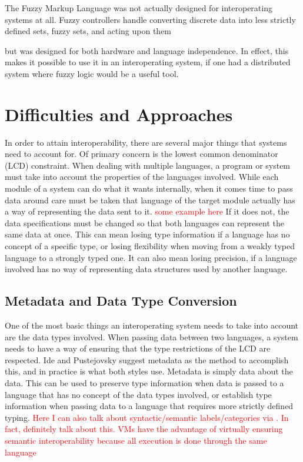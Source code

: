 \documentclass{sig-alternate}
\newcommand{\mycomment}[1]{\textcolor{red}{#1}}
\begin{document}
The Fuzzy Markup Language\cite{Acampora:2013} was not actually designed for interoperating systems at all. Fuzzy controllers handle converting discrete data into less strictly defined sets, fuzzy sets, and acting upon them 

 but was designed for both hardware and language independence. In effect, this makes it possible to use it in an interoperating system, if one had a distributed system where fuzzy logic would be a useful tool.

\section{Difficulties and Approaches}\label{approaches}
In order to attain interoperability, there are several major things that systems need to account for. Of primary concern is the lowest common denominator (LCD) constraint.
When dealing with multiple languages, a program or system must take into account the properties of the languages involved. While each module of a system can do what it wants internally, when it comes time to pass data around care must be taken that language of the target module actually has a way of representing the data sent to it. \mycomment{some example here}
If it does not, the data specifications must be changed so that both languages can represent the same data at once. This can mean losing type information if a language has no concept of a specific type, or losing flexibility when moving from a weakly typed language to a strongly typed one. It can also mean losing precision, if a language involved has no way of representing data structures used by another language.

\subsection{Metadata and Data Type Conversion}\label{metadata} \mycomment{\cite{Ide:2010, Bromberg:2011, Hamilton:2003}}
One of the most basic things an interoperating system needs to take into account are the data types involved. 
When passing data between two languages, a system needs to have a way of ensuring that the type restrictions of the LCD are respected. Ide and Pustejovsky \cite{Ide:2010} suggest metadata as the method to accomplish this, and in practice is what both styles use. Metadata is simply data about the data. This can be used to preserve type information when data is passed to a language that has no concept of the data types involved, or establish type information when passing data to a language that requires more strictly defined typing.
\mycomment{Here I can also talk about syntactic/semantic labels/categories via \cite{Ide:2010}. In fact, definitely talk about this. VMs have the advantage of virtually ensuring semantic interoperability because all execution is done through the same language}
\end{document}

